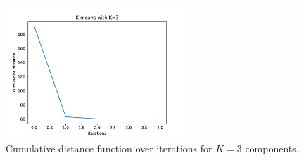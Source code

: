 \documentclass{article}
\begin{document}
\begin{figure}[!ht]
\centering
\includegraphics[width=0.6\textwidth]{./Figures/2_1_Kmeans_distance_K3}
\caption{Cumulative distance function over iterations for $K=3$ components.}
\label{2_1_Kmeans_distance}
\end{figure}
\end{document}
